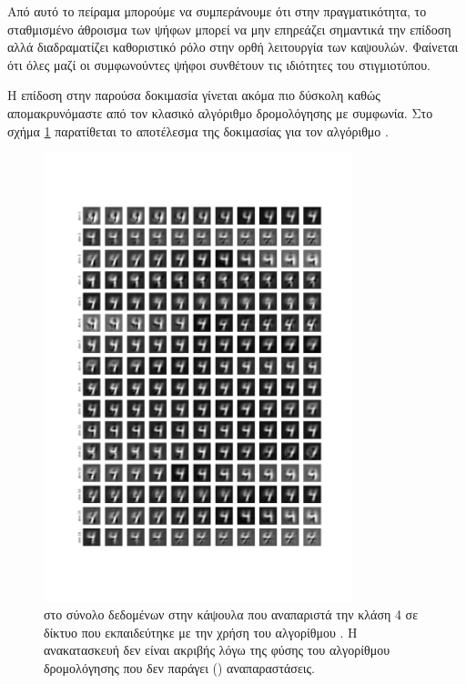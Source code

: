 Από αυτό το πείραμα μπορούμε να συμπεράνουμε ότι στην πραγματικότητα, το σταθμισμένο άθροισμα των ψήφων μπορεί να μην επηρεάζει σημαντικά την επίδοση αλλά διαδραματίζει καθοριστικό ρόλο στην ορθή λειτουργία των καψουλών. Φαίνεται ότι όλες μαζί οι συμφωνούντες ψήφοι συνθέτουν τις ιδιότητες του στιγμιοτύπου.\par

Η επίδοση στην παρούσα δοκιμασία γίνεται ακόμα πιο δύσκολη καθώς απομακρυνόμαστε από τον κλασικό αλγόριθμο δρομολόγησης με συμφωνία. Στο σχήμα \ref{fig:exp_method_1_special_perturb_3} παρατίθεται το αποτέλεσμα της δοκιμασίας για τον αλγόριθμο .\par

\begin{figure}[h]
    \centering
    \includegraphics[width=0.8\textwidth]{images/chapter experiments/method 1/image 8/perturbations_19.png}
    \caption{ στο σύνολο δεδομένων  στην κάψουλα  που αναπαριστά την κλάση 4 σε δίκτυο που εκπαιδεύτηκε με την χρήση του αλγορίθμου . Η ανακατασκευή δεν είναι ακριβής λόγω της φύσης του αλγορίθμου δρομολόγησης που δεν παράγει  () αναπαραστάσεις.}
    \label{fig:exp_method_1_special_perturb_3}
  \end{figure}

